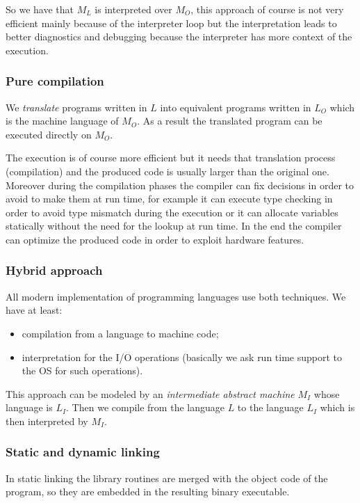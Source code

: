 So we have that $M_L$ is interpreted over $M_O$, this approach of course is not very efficient mainly because of the interpreter loop but the interpretation leads to better diagnostics and debugging because the interpreter has more context of the execution.

\subsubsection{Pure compilation}
We \emph{translate} programs written in $L$ into equivalent programs written in $L_O$ which is the machine language of $M_O$.
As a result the translated program can be executed directly on $M_O$.

The execution is of course more efficient but it needs that translation process (compilation) and the produced code is usually larger than the original one.
Moreover during the compilation phases the compiler can fix decisions in order to avoid to make them at run time, for example it can execute type checking in order to avoid type mismatch during the execution or it can allocate variables statically without the need for the lookup at run time.
In the end the compiler can optimize the produced code in order to exploit hardware features.

\subsubsection{Hybrid approach}
All modern implementation of programming languages use both techniques.
We have at least:
\begin{itemize}
    \item compilation from a language to machine code;
    \item interpretation for the I/O operations (basically we ask run time support to the OS for such operations).
\end{itemize}

This approach can be modeled by an \emph{intermediate abstract machine} $M_I$ whose language is $L_I$.
Then we compile from the language $L$ to the language $L_I$ which is then interpreted by $M_I$.

\subsubsection{Static and dynamic linking}
In static linking the library routines are merged with the object code of the program, so they are embedded in the resulting binary executable.

